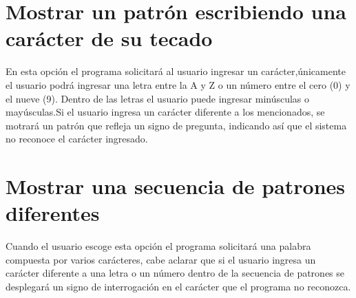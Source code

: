 \documentclass{article}
\begin{document}
\section{Mostrar un patrón escribiendo una carácter de su tecado}\label{op3}
En esta opción el programa solicitará al usuario ingresar un carácter,únicamente el usuario podrá ingresar una letra entre la A y Z o un número entre el cero (0) y el nueve (9). Dentro de las letras el usuario puede ingresar minúsculas o mayúsculas.Si el usuario ingresa un carácter diferente a los mencionados, se motrará un patrón que refleja un signo de pregunta, indicando así que el sistema no reconoce el carácter ingresado.

\section{Mostrar una secuencia de patrones diferentes}\label{op4}
Cuando el usuario escoge esta opción el programa solicitará una palabra compuesta por varios carácteres, cabe aclarar que si el usuario ingresa un carácter diferente a una letra o un número dentro de la secuencia de patrones se desplegará un signo de interrogación en el carácter que el programa no reconozca.




\end{document}
